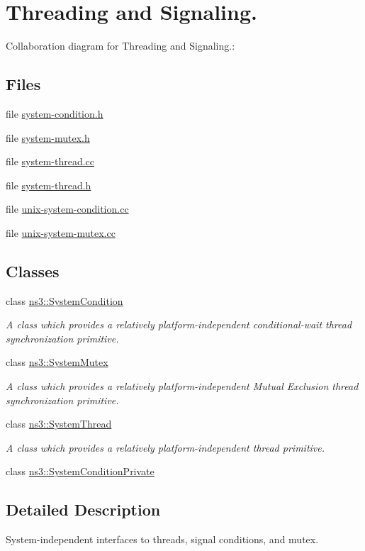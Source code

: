 \hypertarget{group__thread}{}\section{Threading and Signaling.}
\label{group__thread}
Collaboration diagram for Threading and Signaling.\+:
\subsection*{Files}
\begin{DoxyCompactItemize}
\item 
file \hyperlink{system-condition_8h}{system-\/condition.\+h}
\item 
file \hyperlink{system-mutex_8h}{system-\/mutex.\+h}
\item 
file \hyperlink{system-thread_8cc}{system-\/thread.\+cc}
\item 
file \hyperlink{system-thread_8h}{system-\/thread.\+h}
\item 
file \hyperlink{unix-system-condition_8cc}{unix-\/system-\/condition.\+cc}
\item 
file \hyperlink{unix-system-mutex_8cc}{unix-\/system-\/mutex.\+cc}
\end{DoxyCompactItemize}
\subsection*{Classes}
\begin{DoxyCompactItemize}
\item 
class \hyperlink{classns3_1_1SystemCondition}{ns3\+::\+System\+Condition}
\begin{DoxyCompactList}\small\item\em A class which provides a relatively platform-\/independent conditional-\/wait thread synchronization primitive. \end{DoxyCompactList}\item 
class \hyperlink{classns3_1_1SystemMutex}{ns3\+::\+System\+Mutex}
\begin{DoxyCompactList}\small\item\em A class which provides a relatively platform-\/independent Mutual Exclusion thread synchronization primitive. \end{DoxyCompactList}\item 
class \hyperlink{classns3_1_1SystemThread}{ns3\+::\+System\+Thread}
\begin{DoxyCompactList}\small\item\em A class which provides a relatively platform-\/independent thread primitive. \end{DoxyCompactList}\item 
class \hyperlink{classns3_1_1SystemConditionPrivate}{ns3\+::\+System\+Condition\+Private}
\end{DoxyCompactItemize}


\subsection{Detailed Description}
System-\/independent interfaces to threads, signal conditions, and mutex. 